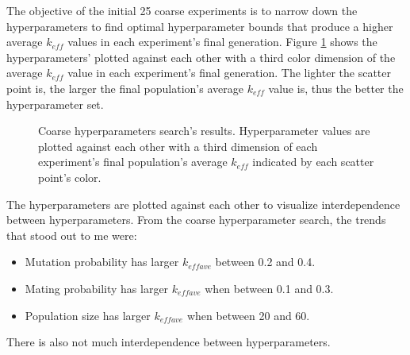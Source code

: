 The objective of the initial 25 coarse experiments is to narrow down the 
hyperparameters to find optimal hyperparameter bounds that produce a
higher average $k_{eff}$ values in each experiment's final generation. 
Figure \ref{fig:hyperparameter_sens} shows the hyperparameters' plotted against 
each other with a third color dimension of the average $k_{eff}$ value in each 
experiment's final generation. 
The lighter the scatter point is, the larger the final population's 
average $k_{eff}$ value is, thus the better the hyperparameter set. 
\begin{figure}[]
    \centering
    \caption{Coarse hyperparameters search's results. Hyperparameter values are plotted 
    against each other with a third dimension of each experiment's final population's 
    average $k_{eff}$ indicated by each scatter point's color.}
    \label{fig:hyperparameter_sens}
\end{figure}
The hyperparameters are plotted against each other to visualize interdependence 
between hyperparameters. 
From the coarse hyperparameter search, the trends that stood out to me were: 
\begin{itemize}
    \item Mutation probability has larger $k_{eff ave}$ between 0.2 and 0.4. 
    \item Mating probability has larger $k_{eff ave}$ when between 0.1 and 0.3. 
    \item Population size has larger $k_{eff ave}$ when between 20 and 60. 
\end{itemize}
There is also not much interdependence between hyperparameters. 

